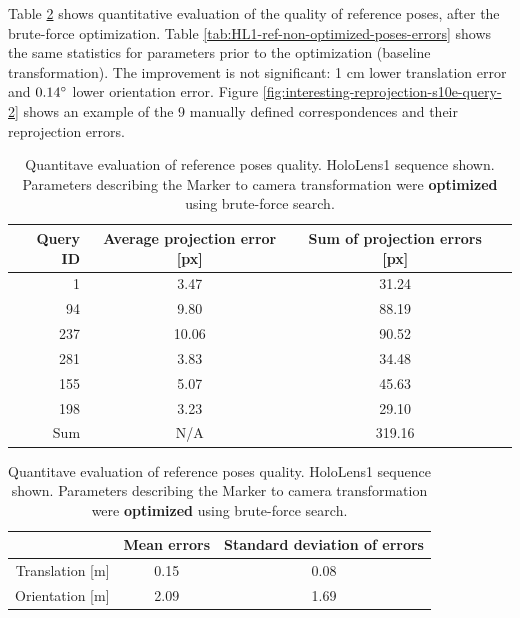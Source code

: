 \documentclass[twoside]{ctuthesis}
\theoremstyle{plain}
\theoremstyle{definition}
\theoremstyle{note}
\newcommand{\HLvsRefPosesErrorsCaption}{Estimate of reference vs ground truth poses errors. All the queries in the sequence were considered, with two kinds of exceptions. Queries, for which we do not have a reference pose (Vicon got lost) are not considered in the statistics. Queries for which we do not have a corresponding pose from HoloLens (due to the delay) are also not included in the statistics. Ground truth poses are estimated from the poses provided from HoloLens, after conversion to World coordinate system.}
\begin{document}
Table \ref{tab:HL1-ref-poses-errors} shows quantitative evaluation of the quality of reference poses, after the brute-force optimization. Table \ref{tab:HL1-ref-non-optimized-poses-errors} shows the same statistics for parameters prior to the optimization (baseline transformation). The improvement is not significant: 1 cm lower translation error and $0.14\degree$ lower orientation error. Figure \ref{fig:interesting-reprojection-s10e-query-2} shows an example of the 9 manually defined correspondences and their reprojection errors.

\begin{table}
	\begin{subtable}{.9\linewidth}\centering
		{
		\footnotesize
		\begin{tabular}{|r|c|c|c|}
			\hline
			Query ID & Average projection error [px] & Sum of projection errors [px] \\
			\hline
			1 & 3.47 & 31.24 \\
			94 & 9.80 & 88.19 \\
			237 & 10.06 & 90.52 \\
			281 & 3.83 & 34.48 \\
			155 & 5.07 & 45.63 \\
			198 & 3.23 & 29.10 \\
			\hline
			\hline
			Sum & N/A & 319.16 \\
			\hline
		\end{tabular}
		}
		\caption{Reprojection error.}
		\label{tab:interesting-reprojection-s10e}
	\quad
	\end{subtable}
	\begin{subtable}{.9\linewidth}\centering
		{
		\footnotesize
		\begin{tabular}{|r||c|c|}
			\hline
			& Mean errors & Standard deviation of errors \\
			\hline
			Translation [m] & 0.15 & 0.08 \\
			Orientation [m] & 2.09 & 1.69 \\
			\hline
		\end{tabular}
		}
		\caption{\HLvsRefPosesErrorsCaption{}}
		\label{tab:HL1-ref-vs-HL-errors}	
	\end{subtable}
	\caption{Quantitave evaluation of reference poses quality. HoloLens1 sequence shown. Parameters describing the Marker to camera transformation were \textbf{optimized} using brute-force search.}
	\label{tab:HL1-ref-poses-errors}
\end{table}
\end{document}

